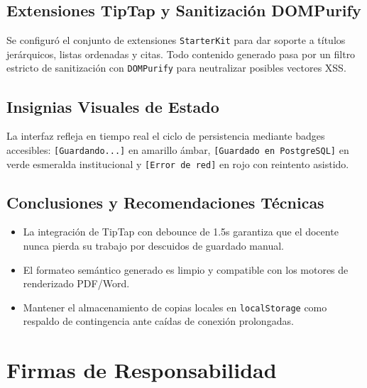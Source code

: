 \documentclass[12pt,a4paper]{article}
\begin{document}
\subsection{Extensiones TipTap y Sanitización DOMPurify}
Se configuró el conjunto de extensiones \texttt{StarterKit} para dar soporte a títulos jerárquicos, listas ordenadas y citas. Todo contenido generado pasa por un filtro estricto de sanitización con \texttt{DOMPurify} para neutralizar posibles vectores XSS.

\subsection{Insignias Visuales de Estado}
La interfaz refleja en tiempo real el ciclo de persistencia mediante badges accesibles: \texttt{[Guardando...]} en amarillo ámbar, \texttt{[Guardado en PostgreSQL]} en verde esmeralda institucional y \texttt{[Error de red]} en rojo con reintento asistido.

\subsection{Conclusiones y Recomendaciones Técnicas}
\begin{itemize}[leftmargin=1.5em, itemsep=2pt]
    \item La integración de TipTap con debounce de 1.5s garantiza que el docente nunca pierda su trabajo por descuidos de guardado manual.
    \item El formateo semántico generado es limpio y compatible con los motores de renderizado PDF/Word.
    \item Mantener el almacenamiento de copias locales en \texttt{localStorage} como respaldo de contingencia ante caídas de conexión prolongadas.
\end{itemize}

\vspace{0.3cm}

\section{Firmas de Responsabilidad}
\end{document}
